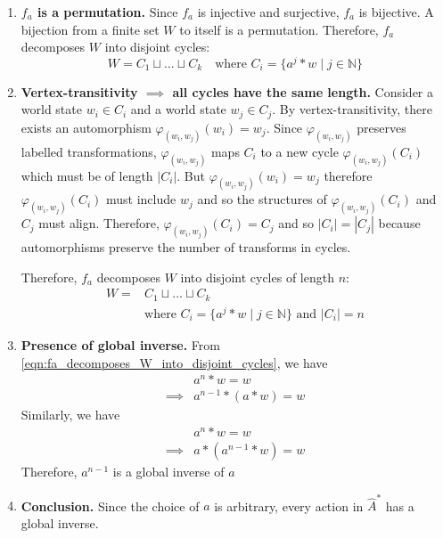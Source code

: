 \begin{proofE}
\begin{enumerate}[(1)]
    \item \textbf{$f_{a}$ is a permutation.}
    Since $f_{a}$ is injective and surjective, $f_{a}$ is bijective.
    A bijection from a finite set $W$ to itself is a permutation.
    Therefore, $f_{a}$ decomposes $W$ into disjoint cycles:
    \begin{equation}
        W = C_{1} \sqcup ... \sqcup C_{k} \quad \text{where } C_{i} = \{a^{j} \ast w \mid j \in \mathbb{N}\}
    \end{equation}

    \item \textbf{Vertex-transitivity $\implies$ all cycles have the same length.}
    Consider a world state $w_{i} \in C_{i}$ and a world state $w_{j} \in C_{j}$.
    By vertex-transitivity, there exists an automorphism $\varphi_{(w_{i}, w_{j})}(w_{i}) = w_{j}$.
    Since $\varphi_{(w_{i}, w_{j})}$ preserves labelled transformations, $\varphi_{(w_{i}, w_{j})}$ maps $C_{i}$ to a new cycle $\varphi_{(w_{i}, w_{j})}(C_{i})$ which must be of length $|C_{i}|$.
    But $\varphi_{(w_{i}, w_{j})}(w_{i}) = w_{j}$ therefore $\varphi_{(w_{i}, w_{j})}(C_{i})$ must include $w_{j}$ and so the structures of $\varphi_{(w_{i}, w_{j})}(C_{i})$ and $C_{j}$ must align.
    Therefore, $\varphi_{(w_{i}, w_{j})}(C_{i}) = C_{j}$ and so $|C_{i}| = |C_{j}|$ because automorphisms preserve the number of transforms in cycles.

    Therefore, $f_{a}$ decomposes $W$ into disjoint cycles of length $n$:
    \begin{equation}\label{eqn:fa_decomposes_W_into_disjoint_cycles}
    \begin{aligned}
        W = & C_{1} \sqcup ... \sqcup C_{k} \\
        & \text{where } C_{i} = \{a^{j} \ast w \mid j \in \mathbb{N}\} \text{ and } |C_{i}| = n
    \end{aligned}
    \end{equation}

    \item \textbf{Presence of global inverse.}
    From \cref{eqn:fa_decomposes_W_into_disjoint_cycles}, we have
    \begin{align}
        & a^{n} \ast w = w \\
        \implies & a^{n-1} \ast (a \ast w) = w
    \end{align}
    Similarly, we have
    \begin{align}
        & a^{n} \ast w = w \\
        \implies & a \ast (a^{n-1} \ast w) = w
    \end{align}
    Therefore, $a^{n-1}$ is a global inverse of $a$

    \item \textbf{Conclusion.}
    Since the choice of $a$ is arbitrary, every action in $\hat{A}^{*}$ has a global inverse.
\end{enumerate}
\end{proofE}


